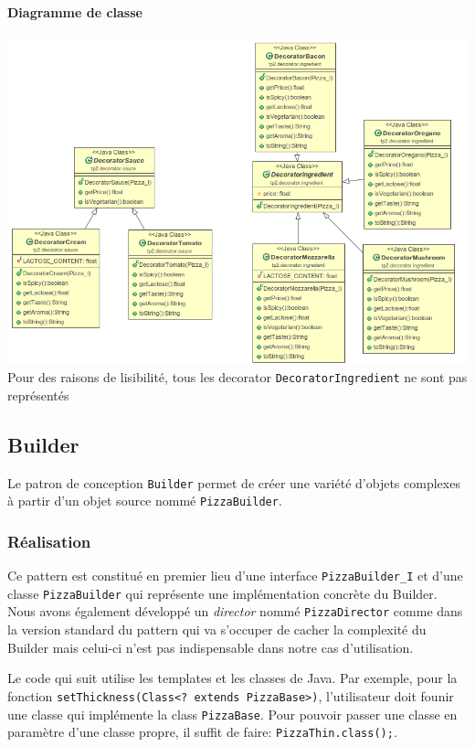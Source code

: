 \documentclass[french,]{article}
\let\oldparagraph\paragraph
\renewcommand{\paragraph}[1]{\oldparagraph{#1}\mbox{}}
\begin{document}
\paragraph{Diagramme de classe}\label{diagramme-de-classe}

\includegraphics{decoratoringredients.png} Pour des raisons de
lisibilité, tous les decorator \texttt{DecoratorIngredient} ne sont pas
représentés

\subsection{Builder}\label{builder}

Le patron de conception \texttt{Builder} permet de créer une variété
d'objets complexes à partir d'un objet source nommé
\texttt{PizzaBuilder}.

\subsubsection{Réalisation}\label{ruxe9alisation-1}

Ce pattern est constitué en premier lieu d'une interface
\texttt{PizzaBuilder\_I} et d'une classe \texttt{PizzaBuilder} qui
représente une implémentation concrète du Builder. Nous avons également
développé un \emph{director} nommé \texttt{PizzaDirector} comme dans la
version standard du pattern qui va s'occuper de cacher la complexité du
Builder mais celui-ci n'est pas indispensable dans notre cas
d'utilisation.

Le code qui suit utilise les templates et les classes de Java. Par
exemple, pour la fonction
\texttt{setThickness(Class\textless{}?\ extends\ PizzaBase\textgreater{})},
l'utilisateur doit founir une classe qui implémente la class
\texttt{PizzaBase}. Pour pouvoir passer une classe en paramètre d'une
classe propre, il suffit de faire: \texttt{PizzaThin.class();}.
\end{document}
